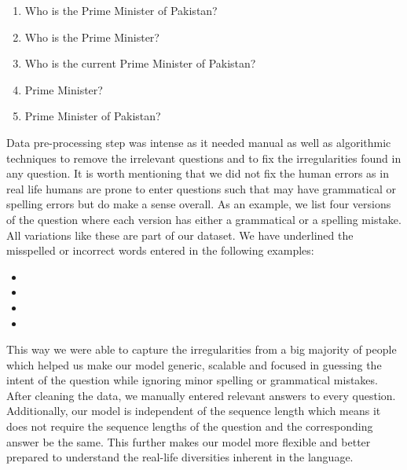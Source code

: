 \documentclass[conference]{IEEEtran}
\begin{document}
\begin{enumerate}
\item Who is the Prime Minister of Pakistan?
\item Who is the Prime Minister? 
\item Who is the current Prime Minister of Pakistan?
\item Prime Minister?
\item Prime Minister of Pakistan?
\end{enumerate}

Data pre-processing step was intense as it needed manual as well as algorithmic techniques to remove the irrelevant questions and to fix the irregularities found in any question. It is worth mentioning that we did not fix the human errors as in real life humans are prone to enter questions such that may have grammatical or spelling errors but do make a sense overall. As an example, we list four versions of the question where each version has either a grammatical or a spelling mistake. All variations like these are part of our dataset. We have underlined the misspelled or incorrect words entered in the following examples:

\begin{itemize}
\item {}
\item {}
\item {}
\item {}
\end{itemize}

This way we were able to capture the irregularities from a big majority of people which helped us make our model generic, scalable and focused in guessing the intent of the question while ignoring minor spelling or grammatical mistakes. After cleaning the data, we manually entered relevant answers to every question. Additionally, our model is independent of the sequence length which means it does not require the sequence lengths of the question and the corresponding answer be the same. This further makes our model more flexible and better prepared to understand the real-life diversities inherent in the language.
\end{document}
